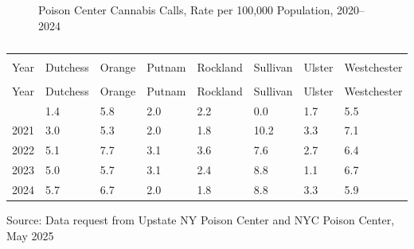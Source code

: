 \documentclass[
  english,
  letterpaper,
]{report}
\begin{document}
\begin{figure}


\caption{\label{fig-poison-control-cannabis}Poison Center Cannabis
Calls, Rate per 100,000 Population, 2020--2024}

\end{figure}%

\begin{longtable}[]{@{}llllllll@{}}

\caption{\label{tbl-poison-control-cannabis}Poison Center Cannabis
Calls, Rate per 100,000 Population, 2020--2024}

\tabularnewline

\caption{}\label{T_ff594}\tabularnewline
\toprule\noalign{}
\multicolumn{8}{@{}l@{}}{%
} \\
Year & Dutchess & Orange & Putnam & Rockland & Sullivan & Ulster &
Westchester \\
\midrule\noalign{}
\endfirsthead
\toprule\noalign{}
\multicolumn{8}{@{}l@{}}{%
} \\
Year & Dutchess & Orange & Putnam & Rockland & Sullivan & Ulster &
Westchester \\
\midrule\noalign{}
\endhead
\bottomrule\noalign{}
\endlastfoot
2020 & 1.4 & 5.8 & 2.0 & 2.2 & 0.0 & 1.7 & 5.5 \\
2021 & 3.0 & 5.3 & 2.0 & 1.8 & 10.2 & 3.3 & 7.1 \\
2022 & 5.1 & 7.7 & 3.1 & 3.6 & 7.6 & 2.7 & 6.4 \\
2023 & 5.0 & 5.7 & 3.1 & 2.4 & 8.8 & 1.1 & 6.7 \\
2024 & 5.7 & 6.7 & 2.0 & 1.8 & 8.8 & 3.3 & 5.9 \\

\end{longtable}

\begin{tcolorbox}[enhanced jigsaw, breakable, leftrule=.75mm, title=\textcolor{quarto-callout-note-color}{\faInfo}\hspace{0.5em}{Source}, bottomrule=.15mm, opacityback=0, left=2mm, colback=white, bottomtitle=1mm, coltitle=black, colbacktitle=quarto-callout-note-color!10!white, colframe=quarto-callout-note-color-frame, opacitybacktitle=0.6, toptitle=1mm, titlerule=0mm, arc=.35mm, rightrule=.15mm, toprule=.15mm]

Source: Data request from Upstate NY Poison Center and NYC Poison
Center, May 2025

\end{tcolorbox}
\end{document}
